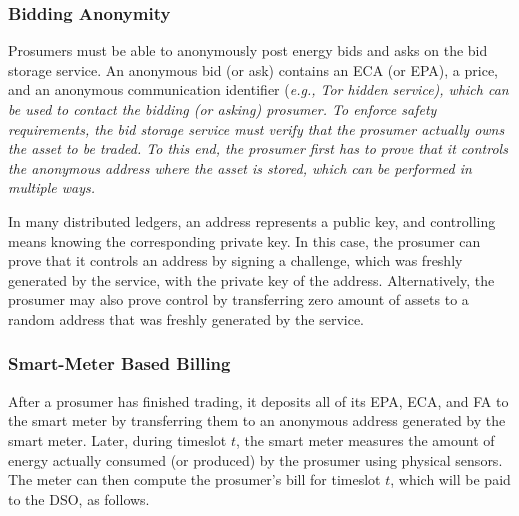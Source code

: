 \subsubsection{Bidding Anonymity}
Prosumers must be able to anonymously post energy bids and asks on the
bid storage service.  An anonymous bid (or ask) contains an ECA (or
EPA), a price, and an anonymous communication identifier (\em{e.g.},
Tor hidden service), which can be used to contact the bidding (or
asking) prosumer.  To enforce safety requirements, the bid storage
service must verify that the prosumer actually owns the asset to be
traded.  To this end, the prosumer first has to prove that it controls
the anonymous address where the asset is stored, which can be
performed in multiple ways.

In many distributed ledgers, an address represents a public key, and
controlling means knowing the corresponding private key.  In this
case, the prosumer can prove that it controls an address by signing a
challenge, which was freshly generated by the service, with the
private key of the address.  Alternatively, the prosumer may also
prove control by transferring zero amount of assets to a random
address that was freshly generated by the service.


\subsubsection{Smart-Meter Based Billing}
After a prosumer has finished trading, it deposits all of its EPA,
ECA, and FA to the smart meter by transferring them to an anonymous
address generated by the smart meter.  Later, during timeslot $t$, the
smart meter measures the amount of energy actually consumed (or
produced) by the prosumer using physical sensors.  The meter can then
compute the prosumer's bill for timeslot $t$, which will be paid to
the DSO, as follows.

